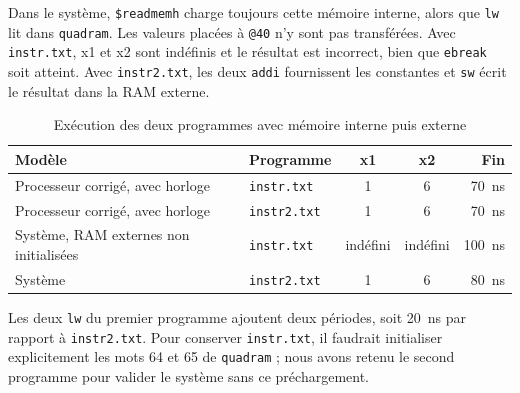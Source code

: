 Dans le système, \texttt{\$readmemh} charge toujours cette mémoire interne, alors que
\texttt{lw} lit dans \texttt{quadram}. Les valeurs placées à \texttt{@40} n'y sont pas
transférées. Avec \texttt{instr.txt}, x1 et x2 sont indéfinis et le résultat est incorrect,
bien que \texttt{ebreak} soit atteint. Avec \texttt{instr2.txt}, les deux \texttt{addi}
fournissent les constantes et \texttt{sw} écrit le résultat dans la RAM externe.

\begin{table}[H]
\centering
\begin{tabular}{llccr}
\toprule
Modèle & Programme & x1 & x2 & Fin \\
\midrule
Processeur corrigé, avec horloge & \texttt{instr.txt} & 1 & 6 & 70~ns \\
Processeur corrigé, avec horloge & \texttt{instr2.txt} & 1 & 6 & 70~ns \\
Système, RAM externes non initialisées & \texttt{instr.txt} & indéfini & indéfini & 100~ns \\
Système & \texttt{instr2.txt} & 1 & 6 & 80~ns \\
\bottomrule
\end{tabular}
\caption{Exécution des deux programmes avec mémoire interne puis externe}
\label{tab:programmes-resultats}
\end{table}

Les deux \texttt{lw} du premier programme ajoutent deux périodes, soit 20~ns par rapport
à \texttt{instr2.txt}. Pour conserver \texttt{instr.txt}, il faudrait initialiser explicitement
les mots 64 et 65 de \texttt{quadram} ; nous avons retenu le second programme pour valider
le système sans ce préchargement.
